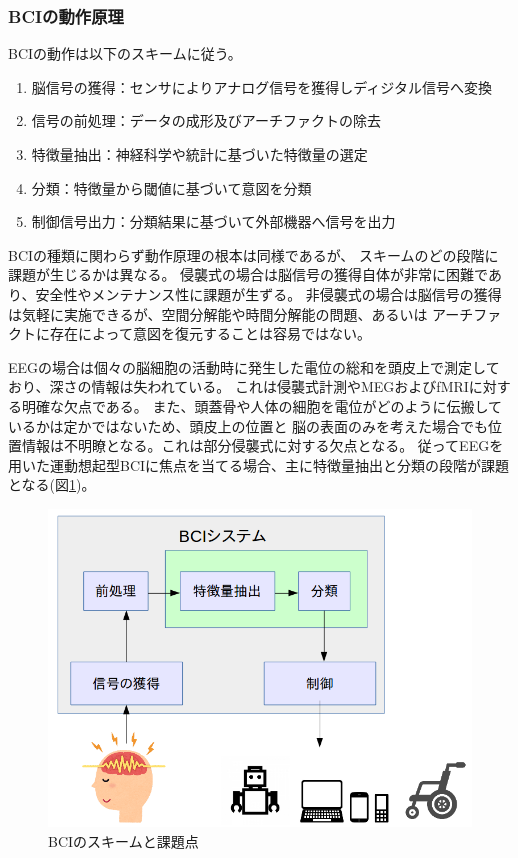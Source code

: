 \subsubsection{BCIの動作原理}
BCIの動作は以下のスキームに従う。
\begin{enumerate}
    \item 脳信号の獲得：センサによりアナログ信号を獲得しディジタル信号へ変換
    \item 信号の前処理：データの成形及びアーチファクトの除去
    \item 特徴量抽出：神経科学や統計に基づいた特徴量の選定
    \item 分類：特徴量から閾値に基づいて意図を分類
    \item 制御信号出力：分類結果に基づいて外部機器へ信号を出力
\end{enumerate}
BCIの種類に関わらず動作原理の根本は同様であるが、
スキームのどの段階に課題が生じるかは異なる。
侵襲式の場合は脳信号の獲得自体が非常に困難であり、安全性やメンテナンス性に課題が生ずる。
非侵襲式の場合は脳信号の獲得は気軽に実施できるが、空間分解能や時間分解能の問題、あるいは
アーチファクトに存在によって意図を復元することは容易ではない。

EEGの場合は個々の脳細胞の活動時に発生した電位の総和を頭皮上で測定しており、深さの情報は失われている。
これは侵襲式計測やMEGおよびfMRIに対する明確な欠点である。
また、頭蓋骨や人体の細胞を電位がどのように伝搬しているかは定かではないため、頭皮上の位置と
脳の表面のみを考えた場合でも位置情報は不明瞭となる。これは部分侵襲式に対する欠点となる。
従ってEEGを用いた運動想起型BCIに焦点を当てる場合、主に特徴量抽出と分類の段階が課題となる(図\ref{fig:BCIsystem})。

\begin{figure}[tb]
    \centering
    \includegraphics[width=14cm]{images/BCIsystem.png}
    \caption{BCIのスキームと課題点}
    \label{fig:BCIsystem}
\end{figure}


